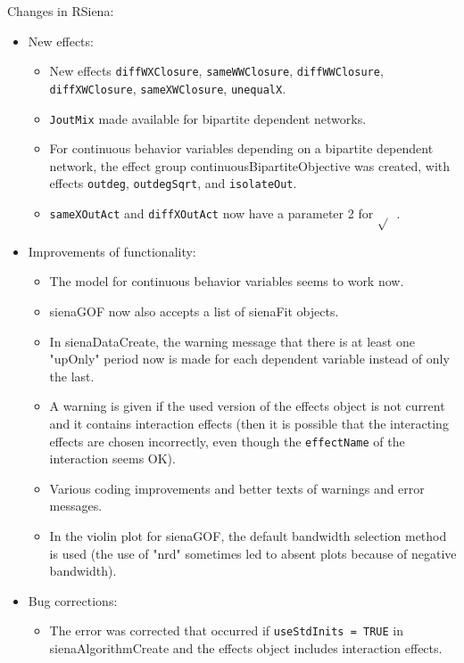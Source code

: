 \documentclass[a4paper,fleqn,11pt]{article}
\newcommand{\+}{\, + \,}
\newcommand{\sfn}[1]{\textsf{#1}}
\begin{document}
\begin{small}
\begin{itemize}
Changes in RSiena:
\begin{itemize}
\item New effects:
   \begin{itemize}
  \item New effects \texttt{diffWXClosure}, \texttt{sameWWClosure},  \texttt{diffWWClosure},
    \texttt{diffXWClosure}, \texttt{sameXWClosure}, \texttt{unequalX}.
  \item \texttt{JoutMix} made available for bipartite dependent networks.
  \item For continuous behavior variables depending on a bipartite dependent
    network, the effect group \sfn{continuousBipartiteObjective} was created,
    with effects \texttt{outdeg}, \texttt{outdegSqrt}, and \texttt{isolateOut}.
  \item \texttt{sameXOutAct} and \texttt{diffXOutAct} now have a
  parameter 2 for $\sqrt{}$\ .
    \end{itemize}
\item Improvements of functionality:
   \begin{itemize}
  \item The model for continuous behavior variables seems to work now.
   \item \sfn{sienaGOF} now also accepts a list of \sfn{sienaFit} objects.
  \item In \sfn{sienaDataCreate}, the warning message that there is at least one
    "upOnly" period now is made for each dependent
    variable instead of only the last.
  \item A warning is given if the used version of the effects object
    is not current and it contains interaction effects
    (then it is possible that the interacting effects are chosen incorrectly,
    even though the \texttt{effectName} of the interaction seems OK).
   \item Various coding improvements and better texts of
   warnings and error messages.
  \item In the violin plot for \sfn{sienaGOF}, the default bandwidth selection
     method is used  (the use of "nrd" sometimes led to absent plots
     because of negative bandwidth).
    \end{itemize}
\item  Bug corrections:
   \begin{itemize}
  \item The error was corrected that occurred if \texttt{useStdInits = TRUE} in
   \sfn{sienaAlgorithmCreate} and the effects object includes interaction effects.
    \end{itemize}
\end{itemize}


\end{itemize}
\end{small}
\end{document}
